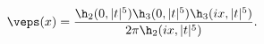 \begin{equation}
\veps(x) = \frac{\h_2(0,|t|^{5})\h_3(0,|t|^{5})\h_3(ix,|t|^{5})}
{2\pi\h_2(ix,|t|^{5})}.
\label{kernel}
\end{equation}

